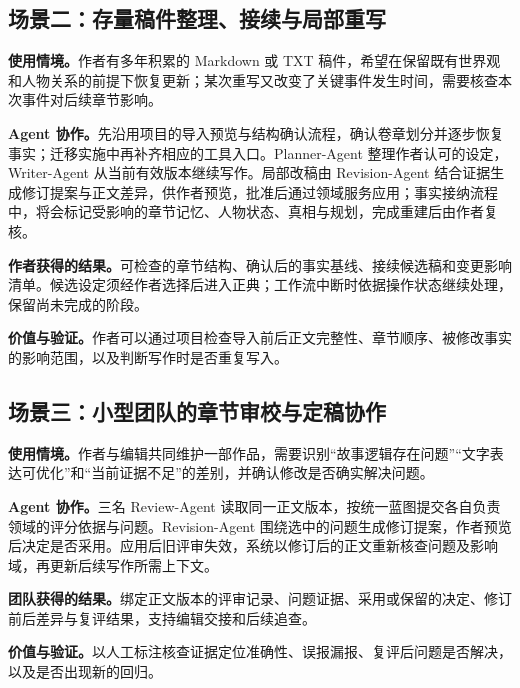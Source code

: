 \subsection{场景二：存量稿件整理、接续与局部重写}

\textbf{使用情境。}作者有多年积累的 Markdown 或 TXT 稿件，希望在保留既有世界观和人物关系的前提下恢复更新；某次重写又改变了关键事件发生时间，需要核查本次事件对后续章节影响。

\textbf{Agent 协作。}先沿用项目的导入预览与结构确认流程，确认卷章划分并逐步恢复事实；迁移实施中再补齐相应的工具入口。Planner-Agent 整理作者认可的设定，Writer-Agent 从当前有效版本继续写作。局部改稿由 Revision-Agent 结合证据生成修订提案与正文差异，供作者预览，批准后通过领域服务应用；事实接纳流程中，将会标记受影响的章节记忆、人物状态、真相与规划，完成重建后由作者复核。

\textbf{作者获得的结果。}可检查的章节结构、确认后的事实基线、接续候选稿和变更影响清单。候选设定须经作者选择后进入正典；工作流中断时依据操作状态继续处理，保留尚未完成的阶段。

\textbf{价值与验证。}作者可以通过项目检查导入前后正文完整性、章节顺序、被修改事实的影响范围，以及判断写作时是否重复写入。

\subsection{场景三：小型团队的章节审校与定稿协作}

\textbf{使用情境。}作者与编辑共同维护一部作品，需要识别“故事逻辑存在问题”“文字表达可优化”和“当前证据不足”的差别，并确认修改是否确实解决问题。

\textbf{Agent 协作。}三名 Review-Agent 读取同一正文版本，按统一蓝图提交各自负责领域的评分依据与问题。Revision-Agent 围绕选中的问题生成修订提案，作者预览后决定是否采用。应用后旧评审失效，系统以修订后的正文重新核查问题及影响域，再更新后续写作所需上下文。

\textbf{团队获得的结果。}绑定正文版本的评审记录、问题证据、采用或保留的决定、修订前后差异与复评结果，支持编辑交接和后续追查。

\textbf{价值与验证。}以人工标注核查证据定位准确性、误报漏报、复评后问题是否解决，以及是否出现新的回归。

